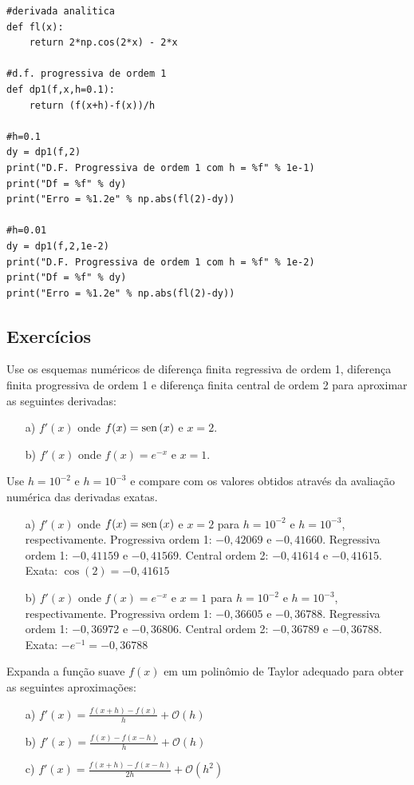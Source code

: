 \begin{resol}
\begin{verbatim}
#derivada analitica
def fl(x):
    return 2*np.cos(2*x) - 2*x

#d.f. progressiva de ordem 1
def dp1(f,x,h=0.1):
    return (f(x+h)-f(x))/h

#h=0.1
dy = dp1(f,2)
print("D.F. Progressiva de ordem 1 com h = %f" % 1e-1)
print("Df = %f" % dy)
print("Erro = %1.2e" % np.abs(fl(2)-dy))

#h=0.01
dy = dp1(f,2,1e-2)
print("D.F. Progressiva de ordem 1 com h = %f" % 1e-2)
print("Df = %f" % dy)
print("Erro = %1.2e" % np.abs(fl(2)-dy))
\end{verbatim}
\fi
\end{resol}


\subsection*{Exercícios}

\begin{exer}
Use os esquemas numéricos de diferença finita regressiva de ordem 1, diferença finita progressiva de ordem 1 e diferença finita central de ordem 2 para aproximar as seguintes derivadas:
\begin{itemize}
\item[a)] $f'(x)$ onde $f(x)=\operatorname{sen}\,(x)$ e $x=2$.
\item[b)] $f'(x)$ onde $f(x)=e^{-x}$ e $x=1$.
\end{itemize}
Use $h=10^{-2}$ e $h=10^{-3}$ e compare com os valores obtidos através da avaliação numérica das derivadas exatas.
\end{exer}
\begin{resp}
  \begin{itemize}
\item[a)] $f'(x)$ onde $f(x)=\operatorname{sen}\,(x)$ e $x=2$ para $h=10^{-2}$ e $h=10^{-3}$, respectivamente.
\subitem Progressiva ordem 1: $-0,42069$ e $-0,41660$.
\subitem Regressiva ordem 1: $-0,41159$ e $-0,41569$.
\subitem Central ordem 2: $-0,41614$ e $-0,41615$.
\subitem Exata: $\cos(2)=-0,41615$
\item[b)] $f'(x)$ onde $f(x)=e^{-x}$ e $x=1$ para $h=10^{-2}$ e $h=10^{-3}$, respectivamente.
\subitem Progressiva ordem 1: $-0,36605$ e $-0,36788$.
\subitem Regressiva ordem 1: $-0,36972$ e $-0,36806$.
\subitem Central ordem 2: $-0,36789$ e $-0,36788$.
\subitem Exata: $-e^{-1}=-0,36788$
  \end{itemize}
 \end{resp}


\begin{exer}\label{ex1} Expanda a função suave $f(x)$ em um polinômio de Taylor adequado para obter as seguintes aproximações:
\begin{itemize}
\item[a)] $f'(x)=\frac{f(x+h)-f(x)}{h}+\mathcal{O}(h)$
\item[b)] $f'(x)=\frac{f(x)-f(x-h)}{h}+\mathcal{O}(h)$
\item[c)] $f'(x)=\frac{f(x+h)-f(x-h)}{2h}+\mathcal{O}(h^2)$
\end{itemize}
\end{exer}%


